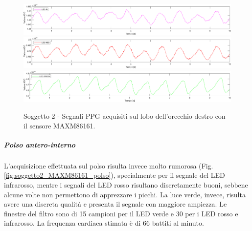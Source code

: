 \begin{figure}[h]
	\centering
	\includegraphics[width=1\linewidth]{ImageFiles/Misure Preliminari/Soggetto 2/maxm86161/lobo_ir_moving_avg}
	\includegraphics[width=1\linewidth]{ImageFiles/Misure Preliminari/Soggetto 2/maxm86161/lobo_red_moving_avg}
	\includegraphics[width=1\linewidth]{ImageFiles/Misure Preliminari/Soggetto 2/maxm86161/lobo_green_moving_avg}
	\caption{Soggetto 2 - Segnali PPG acquisiti sul lobo dell'orecchio destro con il sensore MAXM86161.}
	\label{fig:soggetto2_MAXM86161_lobo}
\end{figure}

\clearpage

\subparagraph{Polso antero-interno}
L'acquisizione effettuata sul polso risulta invece molto rumorosa (Fig. \ref{fig:soggetto2_MAXM86161_polso}), specialmente per il segnale del LED infrarosso, mentre i segnali del LED rosso risultano discretamente buoni, sebbene alcune volte non permettono di apprezzare i picchi. La luce verde, invece, risulta avere una discreta qualità e presenta il segnale con maggiore ampiezza. Le finestre del filtro sono di 15 campioni per il LED verde e 30 per i LED rosso e infrarosso. La frequenza cardiaca stimata è di 66 battiti al minuto.

